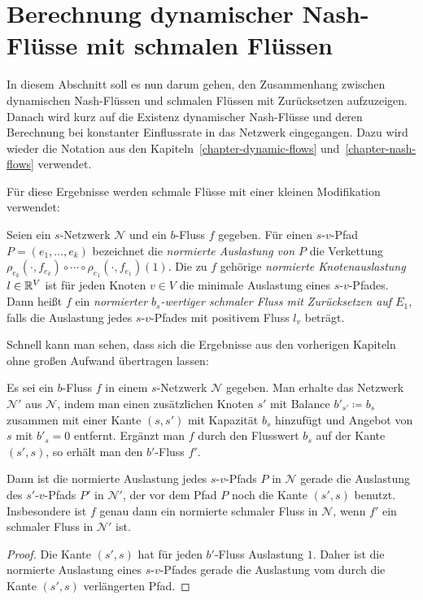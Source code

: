\section{Berechnung dynamischer Nash-Flüsse mit schmalen Flüssen}\label{sec-nash-flow-extension}
In diesem Abschnitt soll es nun darum gehen, den Zusammenhang zwischen dynamischen Nash-Flüssen und schmalen Flüssen mit Zurücksetzen aufzuzeigen.
Danach wird kurz auf die Existenz dynamischer Nash-Flüsse und deren Berechnung bei konstanter Einflussrate in das Netzwerk eingegangen.
Dazu wird wieder die Notation aus den Kapiteln~\ref{chapter-dynamic-flows} und~\ref{chapter-nash-flows} verwendet.

Für diese Ergebnisse werden schmale Flüsse mit einer kleinen Modifikation verwendet:

\begin{definition}\label{def-normalized-thin-flow}
	Seien ein $s$-Netzwerk $\mathcal{N}$ und ein $b$-Fluss $f$ gegeben.
	Für einen $s$-$v$-Pfad $P=(e_1, \dots, e_k)$ bezeichnet die \emph{normierte Auslastung von $P$} die Verkettung $\rho_{e_k}(\cdot, f_{e_k}) \circ \cdots \circ \rho_{e_1}(\cdot, f_{e_1})(1)$.
	Die zu $f$ gehörige \emph{normierte Knotenauslastung} $l\in\mathbb{R}^V$ ist für jeden Knoten $v\in V$ die minimale Auslastung eines $s$-$v$-Pfades.
	Dann heißt $f$ ein \emph{normierter $b_s$-wertiger schmaler Fluss mit Zurücksetzen auf $E_1$}, falls die Auslastung jedes $s$-$v$-Pfades mit positivem Fluss $l_v$ beträgt.
\end{definition}

Schnell kann man sehen, dass sich die Ergebnisse aus den vorherigen Kapiteln ohne großen Aufwand übertragen lassen:

\begin{proposition}
	Es sei ein $b$-Fluss $f$ in einem $s$-Netzwerk $\mathcal{N}$ gegeben.
	Man erhalte das Netzwerk $\mathcal{N}'$ aus $\mathcal{N}$, indem man einen zusätzlichen Knoten $s'$ mit Balance $b'_{s'} \coloneq b_s$ zusammen mit einer Kante $(s, s')$ mit Kapazität $b_s$ hinzufügt und Angebot von $s$ mit $b'_s = 0$ entfernt.
	Ergänzt man $f$ durch den Flusswert $b_s$ auf der Kante $(s', s)$, so erhält man den $b'$-Fluss $f'$.
	
	Dann ist die normierte Auslastung jedes $s$-$v$-Pfads $P$ in $\mathcal{N}$ gerade die Auslastung des $s'$-$v$-Pfads $P'$ in $\mathcal{N}'$, der vor dem Pfad $P$ noch die Kante $(s', s)$ benutzt.
	Insbesondere ist $f$ genau dann ein normierte schmaler Fluss in $\mathcal{N}$, wenn $f'$ ein schmaler Fluss in $\mathcal{N'}$ ist.
\end{proposition}
\begin{proof}
	Die Kante $(s', s)$ hat für jeden $b'$-Fluss Auslastung $1$.
	Daher ist die normierte Auslastung eines $s$-$v$-Pfades gerade die Auslastung vom durch die Kante $(s', s)$ verlängerten Pfad.
\end{proof}

